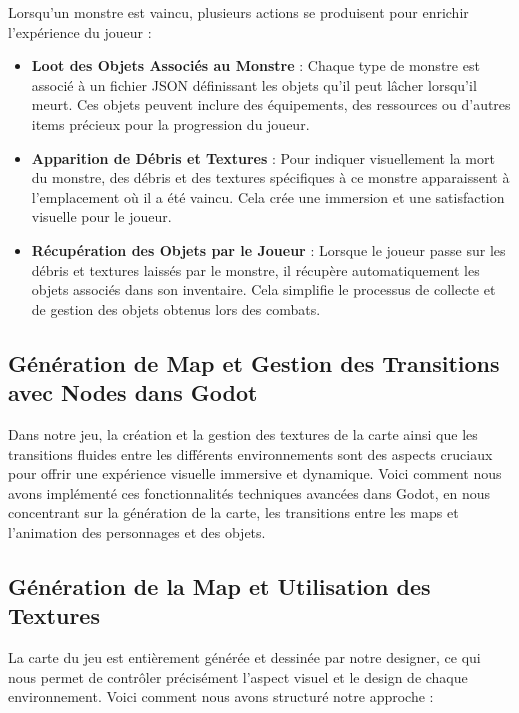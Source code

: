 Lorsqu'un monstre est vaincu, plusieurs actions se produisent pour enrichir l'expérience du joueur :
\\
\begin{itemize}
      \item \textbf{Loot des Objets Associés au Monstre} : Chaque type de monstre est associé à un fichier JSON définissant les objets qu'il peut lâcher lorsqu'il meurt. Ces objets peuvent inclure des équipements, des ressources ou d'autres items précieux pour la progression du joueur.
            \\

      \item \textbf{Apparition de Débris et Textures} : Pour indiquer visuellement la mort du monstre, des débris et des textures spécifiques à ce monstre apparaissent à l'emplacement où il a été vaincu. Cela crée une immersion et une satisfaction visuelle pour le joueur.
            \\

      \item \textbf{Récupération des Objets par le Joueur} : Lorsque le joueur passe sur les débris et textures laissés par le monstre, il récupère automatiquement les objets associés dans son inventaire. Cela simplifie le processus de collecte et de gestion des objets obtenus lors des combats.
\end{itemize}

\subsection{Génération de Map et Gestion des Transitions avec Nodes dans Godot}

Dans notre jeu, la création et la gestion des textures de la carte ainsi que les transitions fluides entre les différents environnements sont
des aspects cruciaux pour offrir une expérience visuelle immersive et dynamique.
Voici comment nous avons implémenté ces fonctionnalités techniques avancées dans Godot, en nous concentrant sur la génération de la carte, les transitions entre les maps et l'animation des personnages et des objets.

\subsection{Génération de la Map et Utilisation des Textures}

La carte du jeu est entièrement générée et dessinée par notre designer, ce qui nous permet de contrôler précisément l'aspect visuel et le design de chaque environnement.
Voici comment nous avons structuré notre approche :

